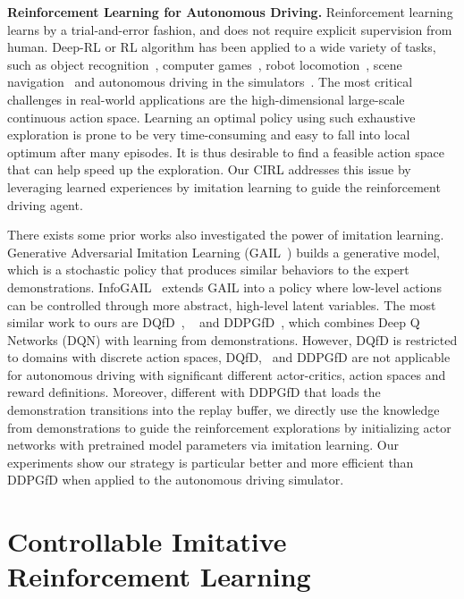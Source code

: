 \documentclass[runningheads]{llncs}
\begin{document}
\textbf{Reinforcement Learning for Autonomous Driving.}
Reinforcement learning learns by a trial-and-error fashion, and does not require explicit supervision from human. Deep-RL or RL algorithm has been applied to a wide variety of tasks, such as object recognition~\cite{liang2017deep,jie2016tree,han2018reinforcement,cao2017attention,liang2017recurrent}, computer games~\cite{mnih2015human}, robot locomotion~\cite{endo2008learning}, scene navigation~\cite{zhu2017target} and autonomous driving in the simulators~\cite{abbeel2007application,shalev2016safe,you2017virtual}. The most critical challenges in real-world applications are the high-dimensional large-scale continuous action space. Learning an optimal policy using such exhaustive exploration is prone to be very time-consuming and easy to fall into local optimum after many episodes. It is thus desirable to find a feasible action space that can help speed up the exploration. Our CIRL addresses this issue by leveraging learned experiences by imitation learning to guide the reinforcement driving agent. 

There exists some prior works also investigated the power of imitation learning. Generative Adversarial Imitation Learning (GAIL~\cite{ho2016generative}) builds a generative model, which is a stochastic policy that produces similar behaviors to the expert
demonstrations. InfoGAIL~\cite{li2017infogail} extends GAIL into a policy where low-level actions can be controlled through more abstract, high-level latent variables. The most similar work to ours are DQfD~\cite{hester2017learning}, ~\cite{latzke2006imitative} and DDPGfD~\cite{vevcerik2017leveraging}, which combines Deep Q Networks (DQN) with learning from demonstrations. However, DQfD is restricted to domains
with discrete action spaces, DQfD,~\cite{latzke2006imitative} and DDPGfD are not applicable for autonomous driving with significant different actor-critics, action spaces and reward definitions. Moreover, different with DDPGfD that loads the demonstration transitions into the replay buffer, we directly use the knowledge from demonstrations to guide the reinforcement explorations by initializing actor networks with pretrained model parameters via imitation learning. Our experiments show our strategy is particular better and more efficient than DDPGfD when applied to the autonomous driving simulator.

\section{Controllable Imitative Reinforcement Learning}
\end{document}
